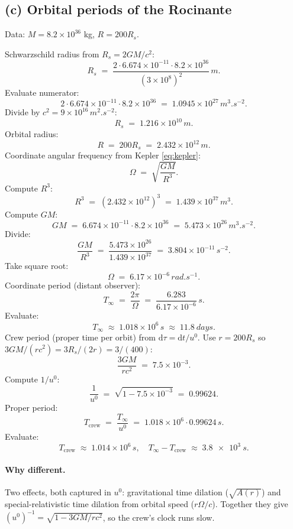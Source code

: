 \documentclass[11pt]{article}
\newcommand{\de}{\mathrm{d}}
\begin{document}
\subsection*{(c) Orbital periods of the Rocinante}

Data: $M=8.2\times 10^{36}$ kg, $R=200 R_s$.

Schwarzschild radius from $R_s=2GM/c^2$:
\[
R_s \;=\; \frac{2\cdot 6.674\times 10^{-11}\cdot 8.2\times 10^{36}}{(3\times 10^{8})^2}\,\si{m}.
\]
Evaluate numerator:
\[
2\cdot 6.674\times 10^{-11}\cdot 8.2\times 10^{36} \;=\; 1.0945\times 10^{27}\,\si{m^3.s^{-2}}.
\]
Divide by $c^2=9\times 10^{16}\,\si{m^2.s^{-2}}$:
\[
R_s \;=\; 1.216\times 10^{10}\,\si{m}.
\]
Orbital radius:
\[
R \;=\; 200 R_s \;=\; 2.432\times 10^{12}\,\si{m}.
\]
Coordinate angular frequency from Kepler \eqref{eq:kepler}:
\[
\Omega \;=\; \sqrt{\frac{GM}{R^3}}.
\]
Compute $R^3$:
\[
R^3 \;=\; (2.432\times 10^{12})^3 \;=\; 1.439\times 10^{37}\,\si{m^3}.
\]
Compute $GM$:
\[
GM \;=\; 6.674\times 10^{-11}\cdot 8.2\times 10^{36} \;=\; 5.473\times 10^{26}\,\si{m^3.s^{-2}}.
\]
Divide:
\[
\frac{GM}{R^3} \;=\; \frac{5.473\times 10^{26}}{1.439\times 10^{37}} \;=\; 3.804\times 10^{-11}\,\si{s^{-2}}.
\]
Take square root:
\[
\Omega \;=\; 6.17\times 10^{-6}\,\si{rad.s^{-1}}.
\]
Coordinate period (distant observer):
\[
T_\infty \;=\; \frac{2\pi}{\Omega} \;=\; \frac{6.283}{6.17\times 10^{-6}}\,\si{s}.
\]
Evaluate:
\begin{equation}
\boxed{\;T_\infty \;\approx\; 1.018\times 10^{6}\,\si{s} \;\approx\; \SI{11.8}{days}.\;}
\label{eq:Tinf}
\end{equation}
Crew period (proper time per orbit) from $\de\tau=\de t/u^0$. Use $r=200 R_s$ so $3GM/(rc^2)=3 R_s/(2r)=3/(400)$:
\[
\frac{3GM}{rc^2} \;=\; 7.5\times 10^{-3}.
\]
Compute $1/u^0$:
\[
\frac{1}{u^0} \;=\; \sqrt{1-7.5\times 10^{-3}} \;=\; 0.99624.
\]
Proper period:
\[
T_{\text{crew}} \;=\; \frac{T_\infty}{u^0} \;=\; 1.018\times 10^{6}\cdot 0.99624\,\si{s}.
\]
Evaluate:
\begin{equation}
\boxed{\;T_{\text{crew}} \;\approx\; 1.014\times 10^{6}\,\si{s},\quad T_\infty - T_{\text{crew}} \;\approx\; \SI{3.8e3}{s}.\;}
\label{eq:Tcrew}
\end{equation}

\paragraph{Why different.}
Two effects, both captured in $u^0$: gravitational time dilation ($\sqrt{A(r)}$) and special-relativistic time dilation from orbital speed ($r\Omega/c$). Together they give $(u^0)^{-1}=\sqrt{1-3GM/rc^2}$, so the crew's clock runs slow.
\end{document}
